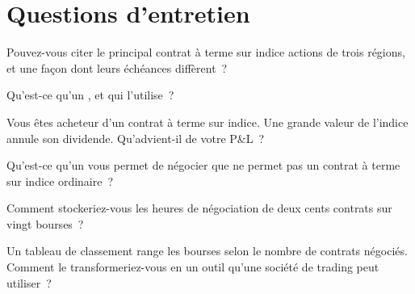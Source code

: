 \section{Questions d'entretien}

\begin{interviewq}\label{iq:m1:index-and-single-stock-futures-worldwide:1}
Pouvez-vous citer le principal contrat à terme sur indice actions de trois régions, et une
façon dont leurs échéances diffèrent~?
\end{interviewq}

\begin{interviewq}\label{iq:m1:index-and-single-stock-futures-worldwide:2}
Qu'est-ce qu'un , et qui l'utilise~?
\end{interviewq}

\begin{interviewq}\label{iq:m1:index-and-single-stock-futures-worldwide:3}
Vous êtes acheteur d'un contrat à terme sur indice. Une grande valeur de l'indice annule son
dividende. Qu'advient-il de votre P\&L~?
\end{interviewq}

\begin{interviewq}\label{iq:m1:index-and-single-stock-futures-worldwide:4}
Qu'est-ce qu'un  vous permet de négocier
que ne permet pas un contrat à terme sur indice ordinaire~?
\end{interviewq}

\begin{interviewq}\label{iq:m1:index-and-single-stock-futures-worldwide:5}
Comment stockeriez-vous les heures de négociation de deux cents contrats sur vingt
bourses~?
\end{interviewq}

\begin{interviewq}\label{iq:m1:index-and-single-stock-futures-worldwide:6}
Un tableau de classement range les bourses selon le nombre de contrats négociés. Comment
le transformeriez-vous en un outil qu'une société de trading peut utiliser~?
\end{interviewq}
